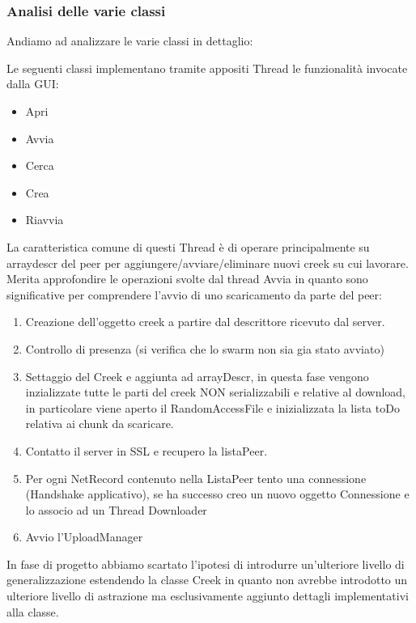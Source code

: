 

\subsubsection{Analisi delle varie classi}
Andiamo ad analizzare le varie classi in dettaglio:

Le seguenti classi implementano tramite appositi Thread le funzionalit\`a invocate dalla GUI:
\begin{itemize}
\item Apri
\item Avvia
\item Cerca
\item Crea
\item Riavvia
\end{itemize}

La caratteristica comune di questi Thread \`e di operare principalmente su arraydescr del peer per aggiungere/avviare/eliminare nuovi creek su cui lavorare.
Merita approfondire le operazioni svolte dal thread Avvia in quanto sono significative per comprendere l'avvio di uno scaricamento da parte del peer:
\begin{enumerate}
\item Creazione dell'oggetto creek a partire dal descrittore ricevuto dal server.
\item Controllo di presenza (si verifica che lo swarm non sia gia stato avviato)
\item Settaggio del Creek e aggiunta ad arrayDescr, in questa fase vengono inzializzate tutte le parti del creek NON serializzabili e relative al download, in particolare viene aperto il RandomAccessFile e inizializzata la lista toDo relativa ai chunk da scaricare.
\item Contatto il server in SSL e recupero la listaPeer.
\item Per ogni NetRecord contenuto nella ListaPeer tento una connessione (Handshake applicativo), se ha successo creo un nuovo oggetto Connessione e lo associo ad un Thread Downloader
\item Avvio l'UploadManager
\end{enumerate}

In fase di progetto abbiamo scartato l'ipotesi di introdurre un'ulteriore livello di generalizzazione estendendo la classe Creek in quanto non avrebbe introdotto un ulteriore livello di astrazione ma esclusivamente aggiunto dettagli implementativi alla classe.

